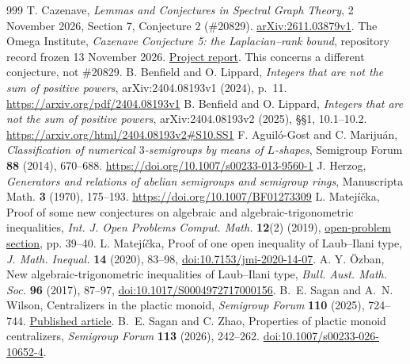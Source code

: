 \documentclass[11pt,a4paper]{article}
\begin{document}
\begin{thebibliography}{999}
T. Cazenave, \emph{Lemmas and Conjectures in Spectral Graph Theory},
2 November 2026, Section 7, Conjecture 2 (\#20829).
\href{https://arxiv.org/html/2611.03879v1}{arXiv:2611.03879v1}.
The Omega Institute, \emph{Cazenave Conjecture 5: the
Laplacian--rank bound}, repository record frozen 13 November 2026.
\href{https://www.trureturing.org/research/op-cazenave2611c5/}{Project report}.
This concerns a different conjecture, not \#20829.
B. Benfield and O. Lippard, \emph{Integers that are not the sum of positive powers}, arXiv:2404.08193v1 (2024), p.~11. \url{https://arxiv.org/pdf/2404.08193v1}
B. Benfield and O. Lippard, \emph{Integers that are not the sum of positive powers}, arXiv:2404.08193v2 (2025), \S\S1, 10.1--10.2. \url{https://arxiv.org/html/2404.08193v2#S10.SS1}
F. Aguil\'o-Gost and C. Mariju\'an, \emph{Classification of numerical $3$-semigroups by means of $L$-shapes}, Semigroup Forum \textbf{88} (2014), 670--688. \url{https://doi.org/10.1007/s00233-013-9560-1}
J. Herzog, \emph{Generators and relations of abelian semigroups and semigroup rings}, Manuscripta Math. \textbf{3} (1970), 175--193. \url{https://doi.org/10.1007/BF01273309}
L. Matej\'i\v{c}ka, Proof of some new conjectures on algebraic and algebraic-trigonometric inequalities, \emph{Int. J. Open Problems Comput. Math.} \textbf{12}(2) (2019), \href{https://www.ijopcm.org/Vol/2019/2.4.pdf}{open-problem section}, pp. 39--40.
L. Matej\'i\v{c}ka, Proof of one open inequality of Laub--Ilani type, \emph{J. Math. Inequal.} \textbf{14} (2020), 83--98, \href{https://doi.org/10.7153/jmi-2020-14-07}{doi:10.7153/jmi-2020-14-07}.
A. Y. \"Ozban, New algebraic-trigonometric inequalities of Laub--Ilani type, \emph{Bull. Aust. Math. Soc.} \textbf{96} (2017), 87--97, \href{https://doi.org/10.1017/S0004972717000156}{doi:10.1017/S0004972717000156}.
B.~E. Sagan and A.~N. Wilson, Centralizers in the plactic monoid, \emph{Semigroup Forum} \textbf{110} (2025), 724--744. \href{https://users.math.msu.edu/users/bsagan/Papers/Old/cpm-pub.pdf}{Published article}.
B.~E. Sagan and C. Zhao, Properties of plactic monoid centralizers, \emph{Semigroup Forum} \textbf{113} (2026), 242--262. \href{https://doi.org/10.1007/s00233-026-10652-4}{doi:10.1007/s00233-026-10652-4}.
\end{thebibliography}
\end{document}
